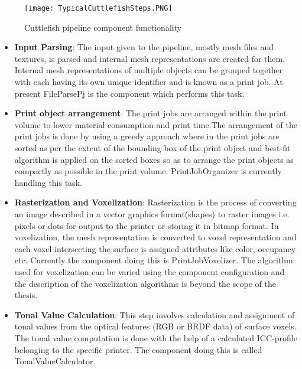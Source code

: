 \begin{figure}[ht!]
\texttt{[image: TypicalCuttlefishSteps.PNG]}
\caption{Cuttlefish pipeline component functionality}
\label{fig:TypicalCuttlefishSteps}
\end{figure}

\begin{itemize}
\item \textbf{Input Parsing}: The input given to the pipeline, mostly mesh files and textures, is parsed and internal mesh representations are created for them. Internal mesh representations of multiple objects can be grouped together with each having it\textquotesingle s own unique identifier and is known as a print job. At present FileParsePj is the component which performs this task. \newline 

\item \textbf{Print object arrangement}: The print jobs are arranged within the print volume to lower material consumption and print time.The arrangement of the print jobs is done by using a greedy approach where in the print jobs are sorted as per the extent of the bounding box of the print object and best-fit algorithm is applied on the sorted boxes so as to arrange the print objects as compactly as possible in the print volume. PrintJobOrganizer is currently handling this task. \newline 

\item \textbf{Rasterization and Voxelization}: Rasterization is the process of converting an image described in a vector graphics format(shapes) to raster images i.e. pixels or dots for output to the printer or storing it in bitmap format. In voxelization, the mesh representation is converted to voxel representation and each voxel intersecting the surface is assigned attributes like color, occupancy etc. Currently the component doing this is PrintJobVoxelizer. The algorithm used for voxelization can be varied using the component configuration and the description of the voxelization algorithms is beyond the scope of the thesis. \newline 
 
\item \textbf{Tonal Value Calculation}: This step involves calculation and assignment of tonal values from the optical features (RGB or BRDF data) of surface voxels. The tonal value computation is done with the help of a calculated ICC-profile  belonging to the specific printer. The component doing this is called TonalValueCalculator.


\end{itemize}
